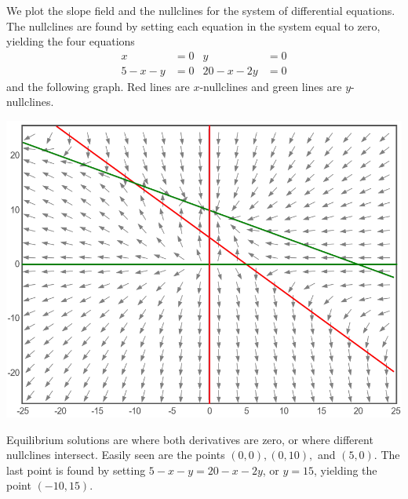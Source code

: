 \documentclass[11pt, titlepage]{article}
\begin{document}
    \begin{solution}
        We plot the slope field and the nullclines for the system of
        differential equations. The nullclines are found by setting each
        equation in the system equal to zero, yielding the four equations
        \begin{align*}
            x &= 0 & y &= 0 \\
            5 - x - y &= 0 & 20 - x - 2y &= 0
        \end{align*}
        and the following graph. Red lines are $x$-nullclines and green lines
        are $y$-nullclines.
        \begin{center}
            \includegraphics[scale=0.5]{media/slopeField1.png}
        \end{center}
        Equilibrium solutions are where both derivatives are zero, or where
        different nullclines intersect. Easily seen are the points $(0, 0), (0,
        10),$ and $(5, 0)$. The last point is found by setting $5 - x - y = 20
        - x - 2y$, or $y = 15$, yielding the point $(-10, 15)$.


\end{solution}
\end{document}

